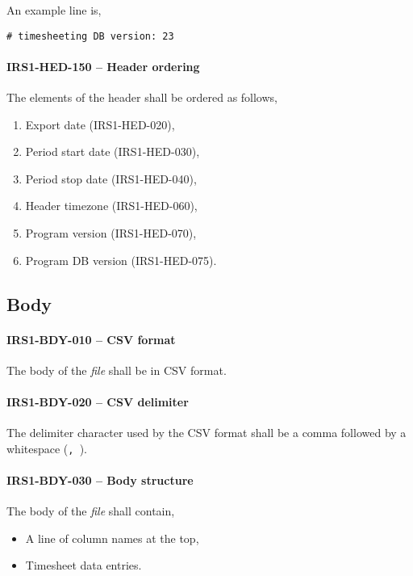 An example line is,
\begin{lstlisting}[numbers=none]
  # timesheeting DB version: 23
\end{lstlisting}

\paragraph{IRS1-HED-150 -- Header ordering}
The elements of the header shall be ordered as follows,
\begin{enumerate}
\item Export date (IRS1-HED-020),
\item Period start date (IRS1-HED-030),
\item Period stop date (IRS1-HED-040),
\item Header timezone (IRS1-HED-060),
\item Program version (IRS1-HED-070),
\item Program \gls{DB} version (IRS1-HED-075).
\end{enumerate}

\subsection{Body}
\paragraph{IRS1-BDY-010 -- CSV format}
The body of the \emph{file} shall be in \gls{CSV} format.

\paragraph{IRS1-BDY-020 -- CSV delimiter}
The delimiter character used by the \gls{CSV} format shall be a comma followed
by a whitespace (\lstinline{, }).

\paragraph{IRS1-BDY-030 -- Body structure}
The body of the \emph{file} shall contain,
\begin{itemize}
\item A line of column names at the top,
\item Timesheet data entries.
\end{itemize}

